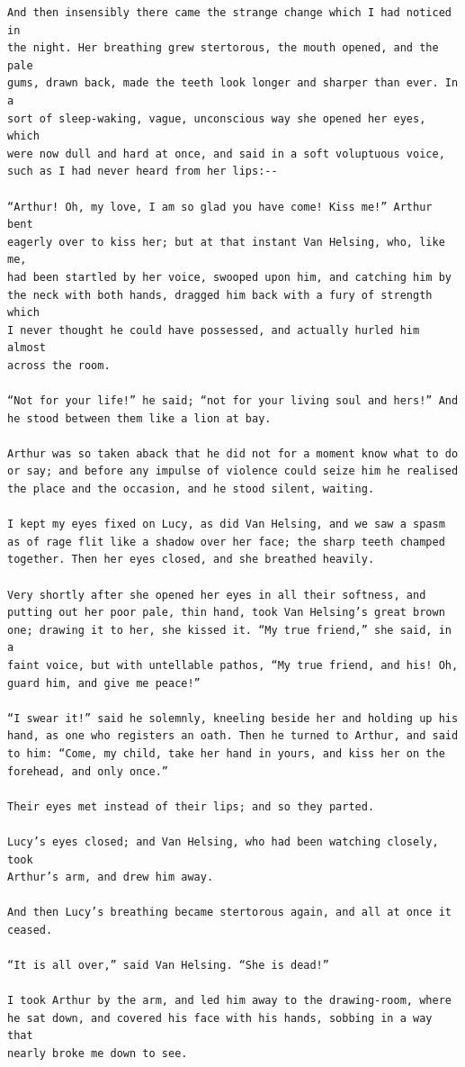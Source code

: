 \documentclass{article}
\begin{document}
\begin{verbatim}
And then insensibly there came the strange change which I had noticed in
the night. Her breathing grew stertorous, the mouth opened, and the pale
gums, drawn back, made the teeth look longer and sharper than ever. In a
sort of sleep-waking, vague, unconscious way she opened her eyes, which
were now dull and hard at once, and said in a soft voluptuous voice,
such as I had never heard from her lips:--

“Arthur! Oh, my love, I am so glad you have come! Kiss me!” Arthur bent
eagerly over to kiss her; but at that instant Van Helsing, who, like me,
had been startled by her voice, swooped upon him, and catching him by
the neck with both hands, dragged him back with a fury of strength which
I never thought he could have possessed, and actually hurled him almost
across the room.

“Not for your life!” he said; “not for your living soul and hers!” And
he stood between them like a lion at bay.

Arthur was so taken aback that he did not for a moment know what to do
or say; and before any impulse of violence could seize him he realised
the place and the occasion, and he stood silent, waiting.

I kept my eyes fixed on Lucy, as did Van Helsing, and we saw a spasm
as of rage flit like a shadow over her face; the sharp teeth champed
together. Then her eyes closed, and she breathed heavily.

Very shortly after she opened her eyes in all their softness, and
putting out her poor pale, thin hand, took Van Helsing’s great brown
one; drawing it to her, she kissed it. “My true friend,” she said, in a
faint voice, but with untellable pathos, “My true friend, and his! Oh,
guard him, and give me peace!”

“I swear it!” said he solemnly, kneeling beside her and holding up his
hand, as one who registers an oath. Then he turned to Arthur, and said
to him: “Come, my child, take her hand in yours, and kiss her on the
forehead, and only once.”

Their eyes met instead of their lips; and so they parted.

Lucy’s eyes closed; and Van Helsing, who had been watching closely, took
Arthur’s arm, and drew him away.

And then Lucy’s breathing became stertorous again, and all at once it
ceased.

“It is all over,” said Van Helsing. “She is dead!”

I took Arthur by the arm, and led him away to the drawing-room, where
he sat down, and covered his face with his hands, sobbing in a way that
nearly broke me down to see.


\end{verbatim}
\end{document}
